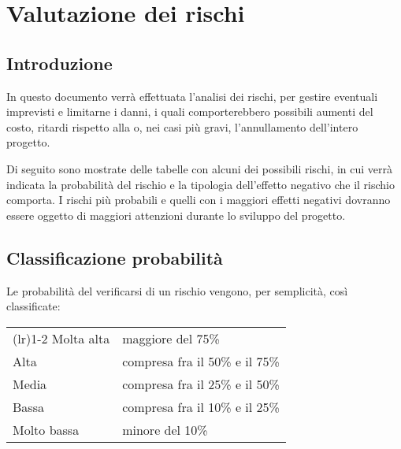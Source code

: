 \chapter{Valutazione dei rischi} 

\section{Introduzione}
In questo documento verrà effettuata l'analisi dei rischi, per gestire eventuali imprevisti e limitarne i danni, i quali comporterebbero possibili aumenti del costo, ritardi rispetto alla  o, nei casi più gravi, l'annullamento dell'intero progetto.

Di seguito sono mostrate delle tabelle con alcuni dei possibili rischi, in cui verrà indicata la probabilità del rischio e la tipologia dell'effetto negativo che il rischio comporta. I rischi più probabili e quelli con i maggiori effetti negativi dovranno essere oggetto di maggiori attenzioni durante lo sviluppo del progetto.

\section{Classificazione probabilità}
Le probabilità del verificarsi di un rischio vengono, per semplicità, così classificate:
\begin{center}
	\begin{tabularx}{\widthTab}{ l  X } 
		\toprule
			\formattaTitoloTab{Classificazione} & \formattaTitoloTab{Probabilità} \\
		\cmidrule(l{\cmidrulekern}r{\cmidrulekern}){1-2}
			Molta alta & maggiore del 75\% \\ 
			\addlinespace[1em] 
			Alta & compresa fra il 50\% e il 75\%  \\ 
			\addlinespace[1em] 
			Media & compresa fra il 25\% e il 50\%  \\ 
			\addlinespace[1em] 
			Bassa & compresa fra il 10\% e il 25\%  \\ 
			\addlinespace[1em] 
			Molto bassa & minore del 10\% \\ 
		\bottomrule
	\end{tabularx}
\end{center}

